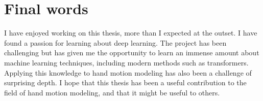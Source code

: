 \section{Final words}

I have enjoyed working on this thesis, more than I expected at the outset. I have found a passion for learning about deep learning. The project has been challenging but has given me the opportunity to learn an immense amount about machine learning techniques, including modern methods such as transformers. Applying this knowledge to hand motion modeling has also been a challenge of surprising depth. I hope that this thesis has been a useful contribution to the field of hand motion modeling, and that it might be useful to others.
